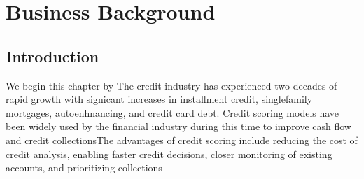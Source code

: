 %
%
%
%

\chapter{Business Background}\label{C.Business.Background}

\section{Introduction}\label{S.intro2}
We begin this chapter by The credit industry has experienced two decades of rapid growth with signicant increases in installment credit, singlefamily mortgages, autoenhnancing, and credit card debt. Credit scoring models have been widely used by the financial industry during this time to improve cash flow and credit collectionsThe advantages of credit scoring include reducing the cost of credit analysis, enabling faster credit decisions, closer monitoring of existing accounts, and prioritizing collections
 